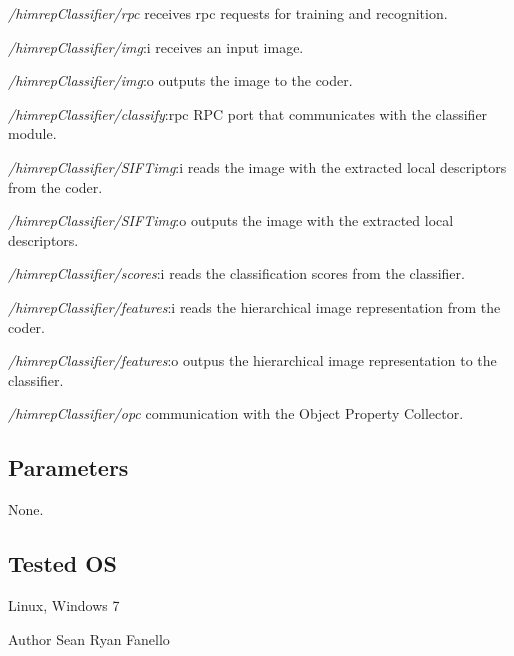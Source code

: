 \begin{DoxyItemize}
\item {\itshape /himrep\+Classifier/rpc} receives rpc requests for training and recognition.
\item {\itshape /himrep\+Classifier/img}\+:i receives an input image.
\item {\itshape /himrep\+Classifier/img}\+:o outputs the image to the coder.
\item {\itshape /himrep\+Classifier/classify}\+:rpc R\+PC port that communicates with the classifier module.
\item {\itshape /himrep\+Classifier/\+S\+I\+F\+Timg}\+:i reads the image with the extracted local descriptors from the coder.
\item {\itshape /himrep\+Classifier/\+S\+I\+F\+Timg}\+:o outputs the image with the extracted local descriptors.
\item {\itshape /himrep\+Classifier/scores}\+:i reads the classification scores from the classifier.
\item {\itshape /himrep\+Classifier/features}\+:i reads the hierarchical image representation from the coder.
\item {\itshape /himrep\+Classifier/features}\+:o outpus the hierarchical image representation to the classifier.
\item {\itshape /himrep\+Classifier/opc} communication with the Object Property Collector.
\end{DoxyItemize}\hypertarget{group__iolReachingCalibration_parameters_sec}{}\subsection{Parameters}\label{group__iolReachingCalibration_parameters_sec}
None.\hypertarget{group__icub__iolStateMachineHandler_tested_os_sec}{}\subsection{Tested OS}\label{group__icub__iolStateMachineHandler_tested_os_sec}
Linux, Windows 7

\begin{DoxyAuthor}{Author}
Sean Ryan Fanello 
\end{DoxyAuthor}
